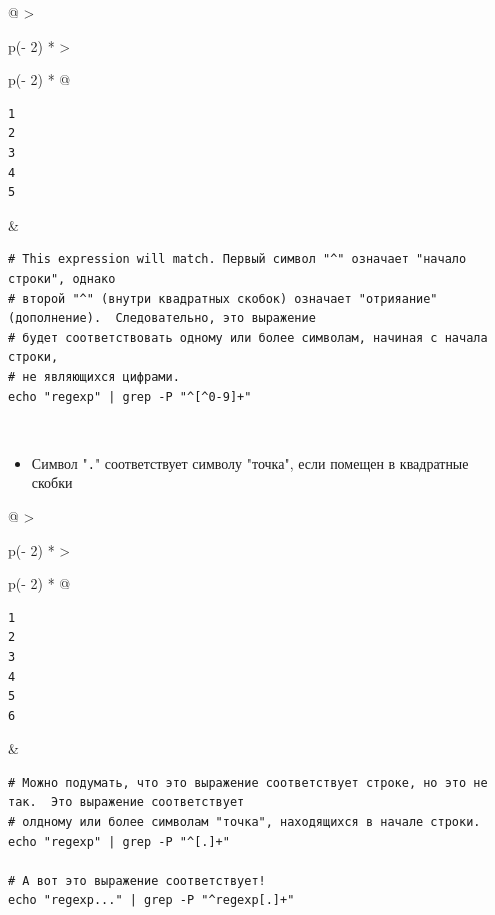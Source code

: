 \documentclass{report}
\begin{document}
\begin{longtable}[]{@{}
  >{\raggedright\arraybackslash}p{(\columnwidth - 2\tabcolsep) * }
  >{\raggedright\arraybackslash}p{(\columnwidth - 2\tabcolsep) * }@{}}
\toprule
\endhead
\begin{minipage}[t]{\linewidth}\raggedright
\begin{verbatim}
1
2
3
4
5
\end{verbatim}
\end{minipage} & \begin{minipage}[t]{\linewidth}\raggedright
\begin{verbatim}
# This expression will match. Первый символ "^" означает "начало строки", однако
# второй "^" (внутри квадратных скобок) означает "отрияание" (дополнение).  Следовательно, это выражение
# будет соответствовать одному или более символам, начиная с начала строки,
# не являющихся цифрами.
echo "regexp" | grep -P "^[^0-9]+"
\end{verbatim}
\end{minipage} \\ \addlinespace
\bottomrule
\end{longtable}

\begin{itemize}
\tightlist
\item
  Символ "\texttt{.}" соответствует символу "точка", если помещен в
  квадратные скобки
\end{itemize}

\begin{longtable}[]{@{}
  >{\raggedright\arraybackslash}p{(\columnwidth - 2\tabcolsep) * }
  >{\raggedright\arraybackslash}p{(\columnwidth - 2\tabcolsep) * }@{}}
\toprule
\endhead
\begin{minipage}[t]{\linewidth}\raggedright
\begin{verbatim}
1
2
3
4
5
6
\end{verbatim}
\end{minipage} & \begin{minipage}[t]{\linewidth}\raggedright
\begin{verbatim}
# Можно подумать, что это выражение соответствует строке, но это не так.  Это выражение соответствует
# олдному или более символам "точка", находящихся в начале строки.
echo "regexp" | grep -P "^[.]+"

# А вот это выражение соответствует!
echo "regexp..." | grep -P "^regexp[.]+"
\end{verbatim}
\end{minipage} \\ \addlinespace
\bottomrule
\end{longtable}
\end{document}
